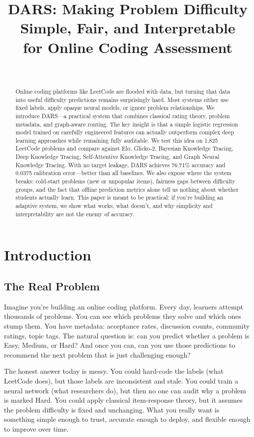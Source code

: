 \documentclass[conference]{IEEEtran}
\title{DARS: Making Problem Difficulty Simple, Fair, and Interpretable\\for Online Coding Assessment}
\author{\IEEEauthorblockN{Khethavath Sunil Naik}\\
\IEEEauthorblockA{BTech Project, India}}
\begin{document}
\maketitle

\begin{abstract}
Online coding platforms like LeetCode are flooded with data, but turning that data into useful difficulty predictions remains surprisingly hard. Most systems either use fixed labels, apply opaque neural models, or ignore problem relationships. We introduce DARS—a practical system that combines classical rating theory, problem metadata, and graph-aware routing. The key insight is that a simple logistic regression model trained on carefully engineered features can actually outperform complex deep learning approaches while remaining fully auditable. We test this idea on 1,825 LeetCode problems and compare against Elo, Glicko-2, Bayesian Knowledge Tracing, Deep Knowledge Tracing, Self-Attentive Knowledge Tracing, and Graph Neural Knowledge Tracing. With no target leakage, DARS achieves 76.71\% accuracy and 0.0375 calibration error—better than all baselines. We also expose where the system breaks: cold-start problems (new or unpopular items), fairness gaps between difficulty groups, and the fact that offline prediction metrics alone tell us nothing about whether students actually learn. This paper is meant to be practical: if you're building an adaptive system, we show what works, what doesn't, and why simplicity and interpretability are not the enemy of accuracy.
\end{abstract}

\section{Introduction}

\subsection{The Real Problem}

Imagine you're building an online coding platform. Every day, learners attempt thousands of problems. You can see which problems they solve and which ones stump them. You have metadata: acceptance rates, discussion counts, community ratings, topic tags. The natural question is: can you predict whether a problem is Easy, Medium, or Hard? And once you can, can you use those predictions to recommend the next problem that is just challenging enough?

The honest answer today is messy. You could hard-code the labels (what LeetCode does), but those labels are inconsistent and stale. You could train a neural network (what researchers do), but then no one can audit why a problem is marked Hard. You could apply classical item-response theory, but it assumes the problem difficulty is fixed and unchanging. What you really want is something simple enough to trust, accurate enough to deploy, and flexible enough to improve over time.
\end{document}

